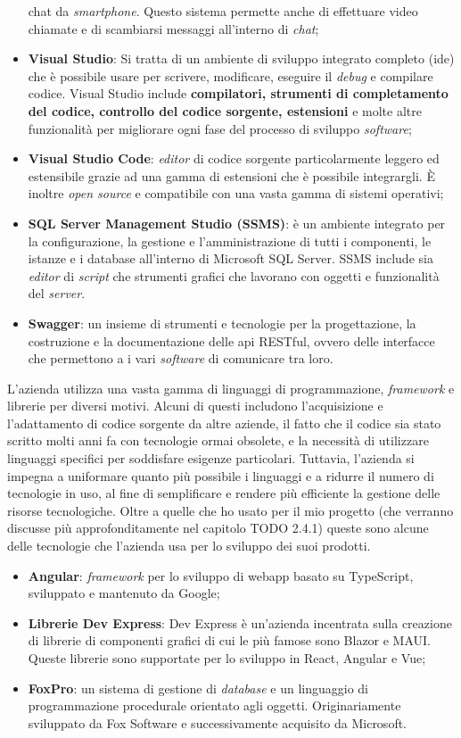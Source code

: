 \begin{itemize}
          chat da \textit{smartphone}. Questo sistema permette anche di effettuare video chiamate e di scambiarsi messaggi all'interno di \textit{chat};
    \item \textbf{Visual Studio}: Si tratta di un ambiente di sviluppo integrato completo (\gls{ide}) che è possibile usare per scrivere, modificare, 
          eseguire il \textit{debug} e compilare codice. Visual Studio include \textbf{compilatori, strumenti di completamento del codice, 
          controllo del codice sorgente, estensioni} e molte altre funzionalità per migliorare ogni fase del processo di sviluppo \textit{software};
    \item \textbf{Visual Studio Code}: \textit{editor} di codice sorgente particolarmente leggero ed estensibile grazie ad una gamma di estensioni 
          che è possibile integrargli. È inoltre \textit{open source} e compatibile con una vasta gamma di sistemi operativi;
    \item \textbf{SQL Server Management Studio (SSMS)}: è un ambiente integrato per la configurazione, la gestione e l'amministrazione di tutti i componenti, 
          le istanze e i database all'interno di Microsoft SQL Server. SSMS include sia \textit{editor} di \textit{script} che strumenti grafici che lavorano con 
          oggetti e funzionalità del \textit{server}.
    \item \textbf{Swagger}: un insieme di strumenti e tecnologie per la progettazione, la costruzione e la documentazione delle \gls{api} RESTful, ovvero delle interfacce 
          che permettono a i vari \textit{software} di comunicare tra loro.
\end{itemize}
L'azienda utilizza una vasta gamma di linguaggi di programmazione, \textit{framework} e librerie per diversi motivi. Alcuni di questi includono l'acquisizione 
e l'adattamento di codice sorgente da altre aziende, il fatto che il codice sia stato scritto molti anni fa con tecnologie ormai obsolete, e la necessità di utilizzare 
linguaggi specifici per soddisfare esigenze particolari. Tuttavia, l'azienda si impegna a uniformare quanto più possibile i linguaggi e a ridurre il numero di tecnologie in 
uso, al fine di semplificare e rendere più efficiente la gestione delle risorse tecnologiche. Oltre a quelle che ho usato per il mio progetto (che verranno discusse 
più approfonditamente nel capitolo TODO 2.4.1) queste sono alcune delle tecnologie che l'azienda usa per lo sviluppo dei suoi prodotti.
\begin{itemize}
    \item \textbf{Angular}: \textit{framework} per lo sviluppo di \gls{webapp} basato su TypeScript, sviluppato e mantenuto da Google;
    \item \textbf{Librerie Dev Express}: Dev Express è un'azienda incentrata sulla creazione di librerie di componenti grafici di cui le più famose sono 
          Blazor e MAUI. Queste librerie sono supportate per lo sviluppo in React, Angular e Vue;
    \item \textbf{FoxPro}: un sistema di gestione di \textit{database} e un linguaggio di programmazione procedurale orientato agli oggetti. Originariamente sviluppato 
          da Fox Software e successivamente acquisito da Microsoft. 
\end{itemize}

